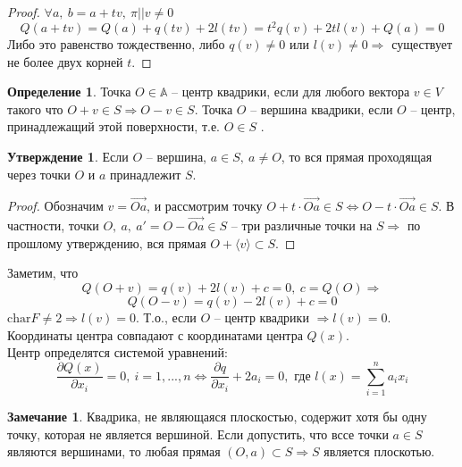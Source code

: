 \documentclass[a4paper, 12pt]{article}
\theoremstyle{definition}
\newtheorem*{definition}{Определение}
\newtheorem*{subtheorem}{Утверждение}
\newtheorem*{remark}{Замечание}
\begin{document}
    \begin{proof}
        $\forall a,\ b = a + tv,\ \pi || v \neq 0$
        $$Q(a + tv) = Q(a) + q(tv) + 2l(tv) = t^2q(v) + 2tl(v)
        + Q(a) = 0$$
        Либо это равенство тождественно, либо $q(v) \neq 0$
        или $l(v) \neq 0 \Longrightarrow $ существует не более
        двух корней $t$. 
    \end{proof}
    \begin{definition}
        Точка $O \in \mathbb{A}$ -- центр квадрики, если 
        для любого вектора $v \in V$ такого что 
        $O + v \in S \Longrightarrow O - v \in S.$ Точка $O$
        -- вершина квадрики, если $O$ -- центр, принадлежащий 
        этой поверхности, т.е. $O \in S$ . 
    \end{definition}
    \begin{subtheorem}
        Если $O$ -- вершина, $a \in S,\ a \neq O$, то вся 
        прямая проходящая через точки $O $ и $a$ принадлежит 
        $S$.
    \end{subtheorem}
    \begin{proof}
        Обозначим $v = \overrightarrow{Oa}$, и рассмотрим точку
        $O + t\cdot \overrightarrow{Oa} \in S 
        \Longleftrightarrow O - t\cdot \overrightarrow{Oa} \in 
        S$. В частности, точки $O,\ a,\ a' = O - 
        \overrightarrow{Oa} \in S$ -- три различные точки на 
        $S \Longrightarrow $ по прошлому утверждению, вся 
        прямая $O + \langle v\rangle \subset S$.

    \end{proof}
    Заметим, что $$Q(O + v) = q(v) + 2l(v) + c = 0,\ c = 
    Q(O) \Longrightarrow$$$$
    Q(O - v) = q(v) - 2l(v) + c = 0$$ $\text{char}F \neq 2 
    \Longrightarrow l(v) = 0$. Т.о., если $O$ -- центр 
    квадрики $\Longrightarrow l(v) = 0$.\\
    Координаты центра совпадают с координатами центра $Q(x)$.\\
    Центр определятся системой уравнений:
    $$\frac{\partial Q(x)}{\partial x_i} = 0,\ i = 1,...,n
    \Longleftrightarrow \frac{\partial q}{\partial x_i} + 
    2a_i = 0, \text{ где } l(x) = \sum\limits_{i=1}^{n} a_ix_i$$
    \begin{remark}
        Квадрика, не являющаяся плоскостью, содержит хотя 
        бы одну точку, которая не является вершиной.
        Если допустить, что вссе точки $a \in S$ являются 
        вершинами, то любая прямая $(O,a) \subset S 
        \Longrightarrow S$ является плоскотью.
    \end{remark}
\end{document}

